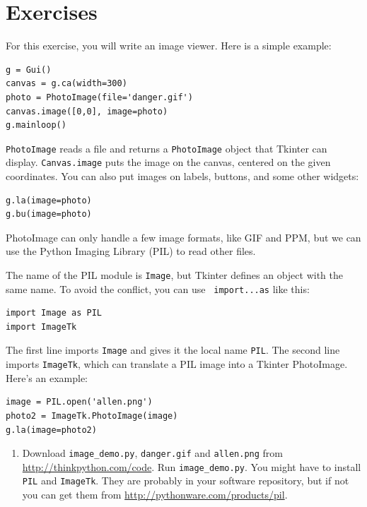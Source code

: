 \documentclass[10pt]{book}
\begin{document}
\section{Exercises}

\begin{exercise}

For this exercise, you will write an image viewer.  Here is
a simple example:

\begin{verbatim}
g = Gui()
canvas = g.ca(width=300)
photo = PhotoImage(file='danger.gif')
canvas.image([0,0], image=photo)
g.mainloop()
\end{verbatim}
%
{\tt PhotoImage} reads a file and returns a {\tt PhotoImage} object
that Tkinter can display.  {\tt Canvas.image} puts the image on the
canvas, centered on the given coordinates.  You can also put images on
labels, buttons, and some other widgets:

\begin{verbatim}
g.la(image=photo)
g.bu(image=photo)
\end{verbatim}
%
PhotoImage can only handle a few image formats, like GIF and PPM, 
but we can use the Python Imaging Library (PIL) to read other
files.

The name of the PIL module is {\tt Image}, but Tkinter defines an
object with the same name.  To avoid the conflict, you can use {\tt
  import...as} like this:

\begin{verbatim}
import Image as PIL
import ImageTk
\end{verbatim}
%
The first line imports {\tt Image} and
gives it the local name {\tt PIL}.  The second
line imports {\tt ImageTk}, which can translate a PIL
image into a Tkinter PhotoImage.  Here's an example:

\begin{verbatim}
image = PIL.open('allen.png')
photo2 = ImageTk.PhotoImage(image)
g.la(image=photo2)
\end{verbatim}
%

\begin{enumerate}

\item Download \verb"image_demo.py", \verb"danger.gif" and \verb"allen.png"
from \url{http://thinkpython.com/code}.  Run \verb"image_demo.py".  You
might have to install {\tt PIL} and {\tt ImageTk}.  
They are probably in your software repository,  but if not
you can get them from \url{http://pythonware.com/products/pil}.


\end{enumerate}
\end{exercise}
\end{document}
